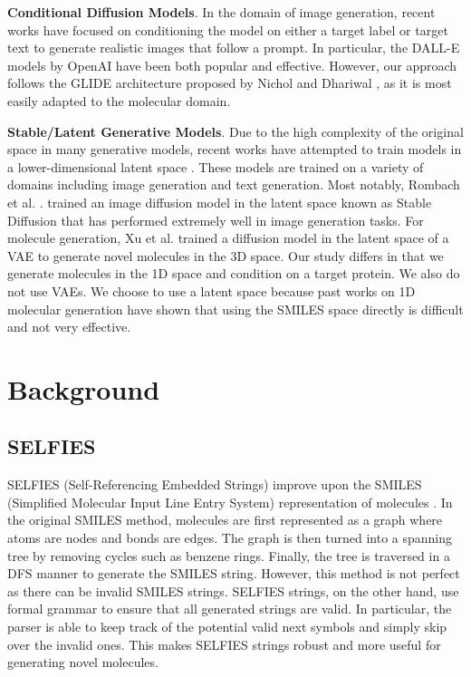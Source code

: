 \documentclass[11pt]{article}
\begin{document}
\textbf{Conditional Diffusion Models}. In the domain of 
image generation, recent works have focused 
on conditioning the model on either a target label or target text 
to generate realistic images that follow a prompt. In particular, 
the DALL-E models \cite{ramesh2021zeroshottexttoimagegeneration} \cite{ramesh2022hierarchicaltextconditionalimagegeneration} by OpenAI have been both popular and effective.
However, our approach follows the GLIDE architecture proposed by 
Nichol and Dhariwal \cite{nichol2022glidephotorealisticimagegeneration}, as it is most easily adapted to the 
molecular domain.

\textbf{Stable/Latent Generative Models}. Due to the high complexity 
of the original space in many generative models, recent works have 
attempted to train models in a lower-dimensional latent space \cite{kalwar2022latentganautoencoderlearningdisentangled} \cite{rombach2022highresolutionimagesynthesislatent}. These 
models are trained on a variety of domains including 
image generation and text generation. Most 
notably, Rombach et al. \cite{rombach2022highresolutionimagesynthesislatent}. trained an image diffusion model in the 
latent space known as Stable Diffusion that has performed extremely 
well in image generation tasks. For molecule generation, Xu et al. \cite{xu2023geometriclatentdiffusionmodels} trained a 
diffusion model in the latent space of a VAE to generate novel molecules 
in the 3D space. Our study differs in that we generate molecules 
in the 1D space and condition on a target protein. We also do not use VAEs.
We choose to use a latent space 
because past works on 1D molecular generation have shown that using the SMILES space directly 
is difficult and not very effective. 

\section{Background}
\subsection{SELFIES}
SELFIES (Self-Referencing Embedded Strings) improve upon the SMILES (Simplified Molecular Input Line Entry System) 
representation of 
molecules \cite{Krenn19}. In the original SMILES method, molecules are first represented 
as a graph where atoms are nodes and bonds are edges. The graph is then turned into a 
spanning tree by removing cycles such as benzene rings. Finally, the tree is traversed in a 
DFS manner to generate the SMILES string. However, this method is not perfect as there can be 
invalid SMILES strings. SELFIES strings, on the other hand, use formal grammar to ensure that 
all generated strings are valid. In particular, the parser is able to keep track of the potential 
valid next symbols and simply skip over the invalid ones. This makes SELFIES strings 
robust and more useful for generating novel molecules.
\end{document}
